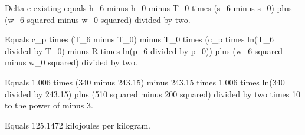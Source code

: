 Delta e existing equals h_6 minus h_0 minus T_0 times (s_6 minus s_0) plus (w_6 squared minus w_0 squared) divided by two.

Equals c_p times (T_6 minus T_0) minus T_0 times (c_p times ln(T_6 divided by T_0) minus R times ln(p_6 divided by p_0)) plus (w_6 squared minus w_0 squared) divided by two.

Equals 1.006 times (340 minus 243.15) minus 243.15 times 1.006 times ln(340 divided by 243.15) plus (510 squared minus 200 squared) divided by two times 10 to the power of minus 3.

Equals 125.1472 kilojoules per kilogram.